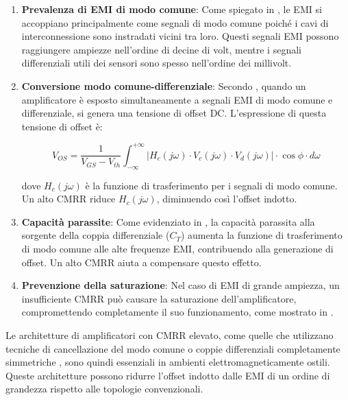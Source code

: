 \begin{enumerate}
    \item \textbf{Prevalenza di EMI di modo comune}: Come spiegato in \cite{finalprint}, le EMI si accoppiano principalmente come segnali di modo comune poiché i cavi di interconnessione sono instradati vicini tra loro. Questi segnali EMI possono raggiungere ampiezze nell'ordine di decine di volt, mentre i segnali differenziali utili dei sensori sono spesso nell'ordine dei millivolt.
    
    \item \textbf{Conversione modo comune-differenziale}: Secondo \cite{An_EMI-Resistant_Common-Mode_Cancelation_Differential_Input_Stage_in_UMC_180_nm_CMOS}, quando un amplificatore è esposto simultaneamente a segnali EMI di modo comune e differenziale, si genera una tensione di offset DC. L'espressione di questa tensione di offset è:
    
    \[V_{OS} = \frac{1}{V_{GS} - V_{th}} \int_{-\infty}^{+\infty} |H_c(j\omega) \cdot V_c(j\omega) \cdot V_d(j\omega)| \cdot \cos\phi \cdot d\omega\]
    
    dove $H_c(j\omega)$ è la funzione di trasferimento per i segnali di modo comune. Un alto CMRR riduce $H_c(j\omega)$, diminuendo così l'offset indotto.
    
    \item \textbf{Capacità parassite}: Come evidenziato in \cite{Redoute-Richelli_EMC_Magazine}, la capacità parassita alla sorgente della coppia differenziale ($C_T$) aumenta la funzione di trasferimento di modo comune alle alte frequenze EMI, contribuendo alla generazione di offset. Un alto CMRR aiuta a compensare questo effetto.
    
    \item \textbf{Prevenzione della saturazione}: Nel caso di EMI di grande ampiezza, un insufficiente CMRR può causare la saturazione dell'amplificatore, compromettendo completamente il suo funzionamento, come mostrato in \cite{An_EMI-Resistant_Common-Mode_Cancelation_Differential_Input_Stage_in_UMC_180_nm_CMOS}.
\end{enumerate}

Le architetture di amplificatori con CMRR elevato, come quelle che utilizzano tecniche di cancellazione del modo comune \cite{An_EMI-Resistant_Common-Mode_Cancelation_Differential_Input_Stage_in_UMC_180_nm_CMOS} o coppie differenziali completamente simmetriche \cite{EMI_Immunity_of_the_Nauta_Inverter-Based_Amplifier}, sono quindi essenziali in ambienti elettromagneticamente ostili. Queste architetture possono ridurre l'offset indotto dalle EMI di un ordine di grandezza rispetto alle topologie convenzionali.

